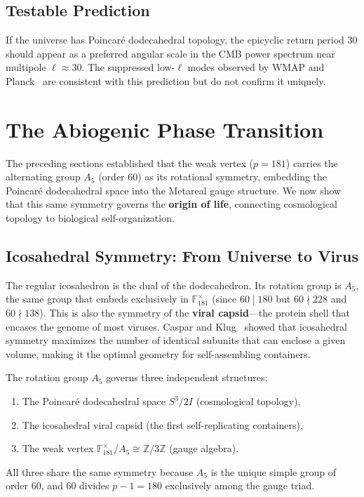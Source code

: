 \subsection{Testable Prediction}

If the universe has Poincar\'{e} dodecahedral topology, the epicyclic return period $30$ should appear as a preferred angular scale in the CMB power spectrum near multipole $\ell \approx 30$. The suppressed low-$\ell$ modes observed by WMAP and Planck~\cite{planck2020} are consistent with this prediction but do not confirm it uniquely.

\section{The Abiogenic Phase Transition}

The preceding sections established that the weak vertex ($p = 181$) carries the alternating group $A_5$ (order 60) as its rotational symmetry, embedding the Poincar\'{e} dodecahedral space into the Metareal gauge structure. We now show that this same symmetry governs the \textbf{origin of life}, connecting cosmological topology to biological self-organization.

\subsection{Icosahedral Symmetry: From Universe to Virus}

The regular icosahedron is the dual of the dodecahedron. Its rotation group is $A_5$, the same group that embeds exclusively in $\mathbb{F}_{181}^{\times}$ (since $60 \mid 180$ but $60 \nmid 228$ and $60 \nmid 138$). This is also the symmetry of the \textbf{viral capsid}---the protein shell that encases the genome of most viruses. Caspar and Klug~\cite{caspar1962} showed that icosahedral symmetry maximizes the number of identical subunits that can enclose a given volume, making it the optimal geometry for self-assembling containers.

\begin{theorem}
The rotation group $A_5$ governs three independent structures:
\begin{enumerate}
    \item The Poincar\'{e} dodecahedral space $S^3/2I$ (cosmological topology),
    \item The icosahedral viral capsid (the first self-replicating containers),
    \item The weak vertex $\mathbb{F}_{181}^{\times}/A_5 \cong \mathbb{Z}/3\mathbb{Z}$ (gauge algebra).
\end{enumerate}
All three share the same symmetry because $A_5$ is the unique simple group of order 60, and 60 divides $p - 1 = 180$ exclusively among the gauge triad.
\end{theorem}


